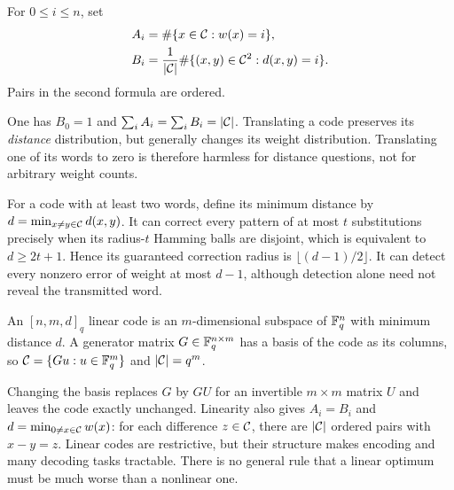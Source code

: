 
\begin{defn}
\label{notation-68}
For $0\leq i\leq n$, set
\begin{align}
 A_i&=\#\{x\in\mathcal{C}:w(x)=i\},\label{eq-defn-weight-distribution}\\
 B_i&=\frac1{|\mathcal{C}|}\#\{(x,y)\in\mathcal{C}^2:d(x,y)=i\}.
 \label{eq-defn-repartition-distance}
\end{align}
Pairs in the second formula are ordered.
\end{defn}
One has $B_0=1$ and $\sum_iA_i=\sum_iB_i=|\mathcal{C}|$.
Translating a code preserves its \emph{distance} distribution, but generally
changes its weight distribution. Translating one of its words to zero is
therefore harmless for distance questions, not for arbitrary weight counts.

For a code with at least two words, define its minimum distance by
$d=\min_{x\ne y\in\mathcal{C}}d(x,y)$. It can correct every pattern of at most
$t$ substitutions precisely when its radius-$t$ Hamming balls are disjoint,
which is equivalent to $d\geq2t+1$. Hence its guaranteed correction radius is
$\lfloor(d-1)/2\rfloor$. It can detect every nonzero error of weight at most
$d-1$, although detection alone need not reveal the transmitted word.


\begin{defn}
An $[n,m,d]_q$ linear code is an $m$-dimensional subspace of $\mathbb{F}_q^n$
with minimum distance $d$. A generator matrix $G\in\mathbb{F}_q^{n\times m}$
has a basis of the code as its columns, so
$\mathcal{C}=\{Gu:u\in\mathbb{F}_q^m\}$ and $|\mathcal{C}|=q^m$.
\end{defn}
Changing the basis replaces $G$ by $GU$ for an invertible $m\times m$
matrix $U$ and leaves the code exactly unchanged. Linearity also gives
$A_i=B_i$ and
$d=\min_{0\ne x\in\mathcal{C}}w(x)$: for each difference $z\in\mathcal{C}$, there are
$|\mathcal{C}|$ ordered pairs with $x-y=z$. Linear codes are restrictive, but their
structure makes encoding and many decoding tasks tractable. There is no
general rule that a linear optimum must be much worse than a nonlinear one.



